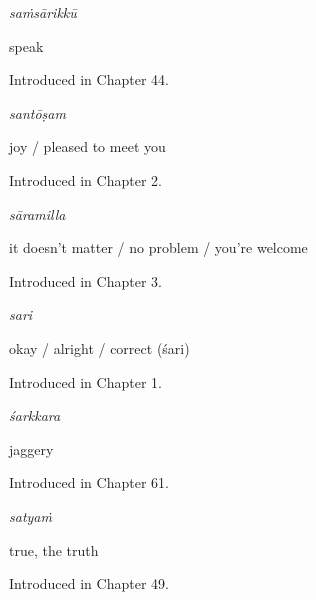 \noindent\begin{minipage}[t]{\linewidth}
\raggedright
\textbf{}\enspace\emph{saṁsārikkū}\par
\small speak\par
\footnotesize Introduced in Chapter 44.
\end{minipage}\par\medskip

\noindent\begin{minipage}[t]{\linewidth}
\raggedright
\textbf{}\enspace\emph{santōṣam}\par
\small joy / pleased to meet you\par
\footnotesize Introduced in Chapter 2.
\end{minipage}\par\medskip

\noindent\begin{minipage}[t]{\linewidth}
\raggedright
\textbf{}\enspace\emph{sāramilla}\par
\small it doesn't matter / no problem / you're welcome\par
\footnotesize Introduced in Chapter 3.
\end{minipage}\par\medskip

\noindent\begin{minipage}[t]{\linewidth}
\raggedright
\textbf{}\enspace\emph{sari}\par
\small okay / alright / correct (śari)\par
\footnotesize Introduced in Chapter 1.
\end{minipage}\par\medskip

\noindent\begin{minipage}[t]{\linewidth}
\raggedright
\textbf{}\enspace\emph{śarkkara}\par
\small jaggery\par
\footnotesize Introduced in Chapter 61.
\end{minipage}\par\medskip

\noindent\begin{minipage}[t]{\linewidth}
\raggedright
\textbf{}\enspace\emph{satyaṁ}\par
\small true, the truth\par
\footnotesize Introduced in Chapter 49.
\end{minipage}\par\medskip

